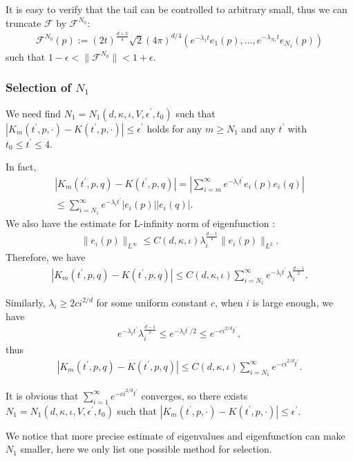 It is easy to verify that the tail can be controlled to arbitrary small, thus we can truncate $\mathcal{F}$ by $\mathcal{F}^{N_0}$:
\begin{align}
	\mathcal{F}^{N_0}(p) := (2t)^{\frac{d+2}{4}}\sqrt{2}(4\pi)^{d/4} \left(e^{-\lambda_1 t} e_1(p),\dots, e^{-\lambda_{N_1} t} e_{N_1}(p)\right)
\end{align}
such that $1-\epsilon < \|\mathcal{F}^{N_0}\| <1+\epsilon$.


\subsubsection{Selection of \texorpdfstring{$N_1$}{N1}}

We need find $N_1=N_1(d,\kappa,\iota,V,\epsilon^\prime,t_0)$ such that $|K_m(t^\prime,p,\cdot)-K(t^\prime,p,\cdot)|\leq \epsilon^\prime$ holds for any $m\geq N_1$ and any $t^\prime$ with $t_0\leq t^\prime \leq 4$.

In fact,
\begin{align}
	|K_{m}(t^\prime,p,q)-K(t^\prime,p,q)| = |\sum_{i=m}^{\infty} e^{-\lambda_i t^\prime} e_i(p)e_i(q)| \\
	\leq \sum_{i=N_1}^{\infty} e^{-\lambda_i t^\prime}| e_i(p)| |e_i(q)|.
\end{align}
We also have the estimate for L-infinity norm of eigenfunction \cite{ajm/1154098927}:
\begin{align}
	\|e_i(p)\|_{L^\infty} \leq C(d,\kappa,\iota) \lambda_i^ {\frac{d-1}{4}} \|e_i(p)\|_{L^2}.
\end{align}
Therefore, we have
\begin{align}
		|K_m(t^\prime,p,q)-K(t^\prime,p,q)| \leq C(d,\kappa,\iota) \sum_{i=N_1}^{\infty} e^{-\lambda_i t^\prime} \lambda_i^ {\frac{d-1}{2}}.
\end{align}

Similarly, $\lambda_i \geq 2c i^{2/d}$ for some uniform constant $c$, when $i$ is large enough, we have 
\begin{align}
	e^{-\lambda_i t^\prime} \lambda_i^ {\frac{d-1}{2}} \leq e^{-\lambda_i t^\prime /2} \leq e^{-c i^{2/d} t^\prime},
\end{align}
thus
\begin{align}
|K_m(t^\prime,p,q)-K(t^\prime,p,q)| \leq C(d,\kappa,\iota) \sum_{i=N_1}^{\infty} e^{-c i^{2/d} t^\prime}.
\end{align}

It is obvious that $\sum_{i=1}^{\infty} e^{-c i^{2/d} t^\prime}$ converges, so there exists  $N_1=N_1(d,\kappa,\iota,V,\epsilon^\prime,t_0)$ such that $|K_m(t^\prime,p,\cdot)-K(t^\prime,p,\cdot)|\leq \epsilon^\prime$. 

We notice that more precise estimate of eigenvalues and eigenfunction can make $N_1$ smaller, here we only list one possible method for selection.